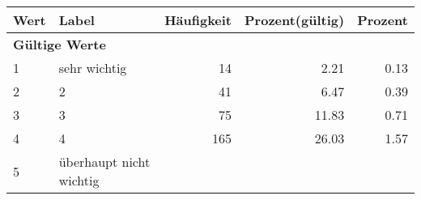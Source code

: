      \begin{longtable}{lXrrr}
     \toprule
     \textbf{Wert} & \textbf{Label} & \textbf{Häufigkeit} & \textbf{Prozent(gültig)} & \textbf{Prozent} \\
     \endhead
     \midrule
     \multicolumn{5}{l}{\textbf{Gültige Werte}}\\

     1 &
     \multicolumn{1}{X}{ sehr wichtig   } &


       \num{14} &
       \num[round-mode=places,round-precision=2]{2.21} &
         \num[round-mode=places,round-precision=2]{0.13} \\

     2 &
     \multicolumn{1}{X}{ 2   } &


       \num{41} &
       \num[round-mode=places,round-precision=2]{6.47} &
         \num[round-mode=places,round-precision=2]{0.39} \\

     3 &
     \multicolumn{1}{X}{ 3   } &


       \num{75} &
       \num[round-mode=places,round-precision=2]{11.83} &
         \num[round-mode=places,round-precision=2]{0.71} \\

     4 &
     \multicolumn{1}{X}{ 4   } &


       \num{165} &
       \num[round-mode=places,round-precision=2]{26.03} &
         \num[round-mode=places,round-precision=2]{1.57} \\

     5 &
     \multicolumn{1}{X}{ überhaupt nicht wichtig   } &



\end{longtable}
